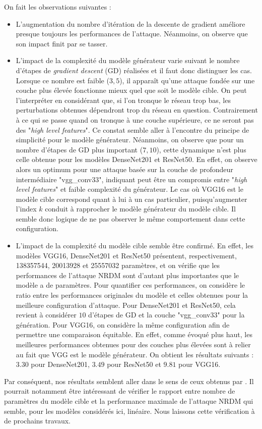 \documentclass{article}
\begin{document}
\noindent On fait les observations suivantes :
\begin{itemize}
    \item L'augmentation du nombre d'itération de la descente de gradient améliore presque toujours les performances de l'attaque. Néanmoins, on observe que son impact finit par se tasser.
    \item L'impact de la complexité du modèle générateur varie suivant le nombre d'étapes de \textit{gradient descent} (GD) réalisées et il faut donc distinguer les cas. Lorsque ce nombre est faible ($3,5$), il apparaît qu'une attaque fondée sur une couche plus élevée fonctionne mieux quel que soit le modèle cible. On peut l'interpréter en considérant que, si l'on tronque le réseau trop bas, les perturbations obtenues dépendront trop du réseau en question. Contrairement à ce qui se passe quand on tronque à une couche supérieure, ce ne seront pas des "\textit{high level features}". Ce  constat semble aller à l'encontre du principe de simplicité pour le modèle générateur. Néanmoins, on observe que pour un nombre d'étapes de GD plus important ($7,10$), cette dynamique n'est plus celle obtenue pour les modèles DenseNet201 et ResNet50. En effet, on observe alors un optimum pour une attaque basée sur la couche de profondeur intermédiaire "vgg\_conv33", indiquant peut être un compromis entre "\textit{high level features}" et faible complexité du générateur. Le cas où VGG16 est le modèle cible correspond quant à lui à un cas particulier, puisqu'augmenter l'index $k$ conduit à rapprocher le modèle générateur du modèle cible. Il semble donc logique de ne pas observer le même comportement dans cette configuration.
    \item L'impact de la complexité du modèle cible semble être confirmé. En effet, les modèles VGG16, DenseNet201 et ResNet50 présentent, respectivement, 138357544, 20013928 et 25557032 paramètres, et on vérifie que les performances de l'attaque NRDM sont d'autant plus importantes que le modèle a de paramètres. Pour quantifier ces performances, on considère le ratio entre les performances originales du modèle et celles obtenues pour la meilleure configuration d'attaque. Pour DenseNet201 et ResNet50, cela revient à considérer $10$ d'étapes de GD et la couche "vgg\_conv33" pour la génération. Pour VGG16, on considère la même configuration afin de permettre une comparaison équitable. En effet, comme évoqué plus haut, les meilleures performances obtenues pour des couches plus élevées sont à relier au fait que VGG est le modèle générateur. On obtient les résultats suivants : $3.30$ pour DenseNet201, $3.49$ pour ResNet50 et $9.81$ pour VGG16.
\end{itemize}
Par conséquent, nos résultats semblent aller dans le sens de ceux obtenus par \citet{Demontis2018WhyDA}. Il pourrait notamment être intéressant de vérifier le rapport entre nombre de paramètres du modèle cible et la performance maximale de l'attaque NRDM qui semble, pour les modèles considérés ici, linéaire. Nous laissons cette vérification à de prochains travaux.
\end{document}

